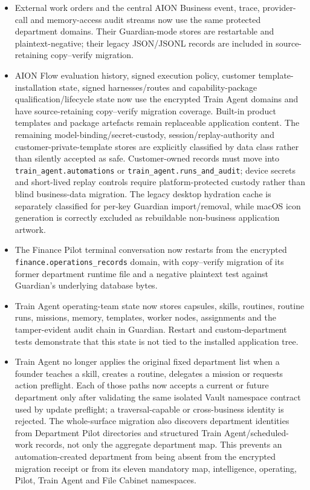 \documentclass[11pt]{article}
\begin{document}
\begin{itemize}
  \item External work orders and the central AION Business event, trace, provider-call and memory-access audit streams now use the same protected department domains. Their Guardian-mode stores are restartable and plaintext-negative; their legacy JSON/JSONL records are included in source-retaining copy--verify migration.
  \item AION Flow evaluation history, signed execution policy, customer template-installation state, signed harnesses/routes and capability-package qualification/lifecycle state now use the encrypted Train Agent domains and have source-retaining copy--verify migration coverage. Built-in product templates and package artefacts remain replaceable application content. The remaining model-binding/secret-custody, session/replay-authority and customer-private-template stores are explicitly classified by data class rather than silently accepted as safe. Customer-owned records must move into \texttt{train\_agent.automations} or \texttt{train\_agent.runs\_and\_audit}; device secrets and short-lived replay controls require platform-protected custody rather than blind business-data migration. The legacy desktop hydration cache is separately classified for per-key Guardian import/removal, while macOS icon generation is correctly excluded as rebuildable non-business application artwork.
  \item The Finance Pilot terminal conversation now restarts from the encrypted \texttt{finance.operations\_records} domain, with copy--verify migration of its former department runtime file and a negative plaintext test against Guardian's underlying database bytes.
  \item Train Agent operating-team state now stores capsules, skills, routines, routine runs, missions, memory, templates, worker nodes, assignments and the tamper-evident audit chain in Guardian. Restart and custom-department tests demonstrate that this state is not tied to the installed application tree.
  \item Train Agent no longer applies the original fixed department list when a founder teaches a skill, creates a routine, delegates a mission or requests action preflight. Each of those paths now accepts a current or future department only after validating the same isolated Vault namespace contract used by update preflight; a traversal-capable or cross-business identity is rejected. The whole-surface migration also discovers department identities from Department Pilot directories and structured Train Agent/scheduled-work records, not only the aggregate department map. This prevents an automation-created department from being absent from the encrypted migration receipt or from its eleven mandatory map, intelligence, operating, Pilot, Train Agent and File Cabinet namespaces.

\end{itemize}
\end{document}
